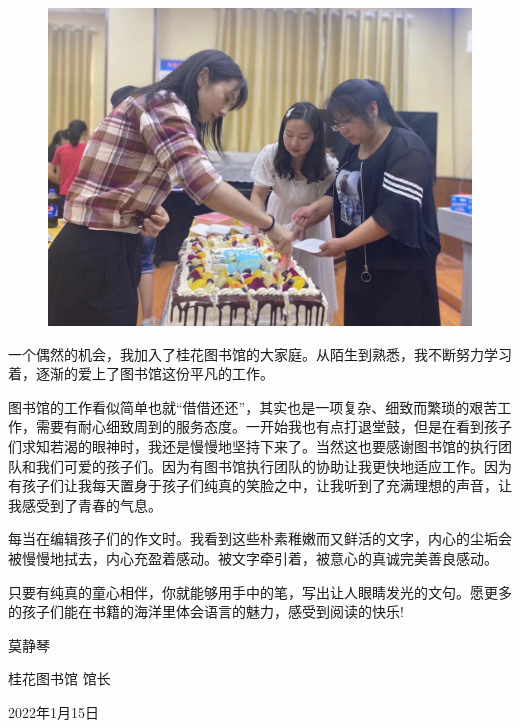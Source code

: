 \begin{figure}[htbp]

\centering

\includegraphics[width = .5\textwidth]{./ch/mjq.jpg}

\end{figure}



一个偶然的机会，我加入了桂花图书馆的大家庭。从陌生到熟悉，我不断努力学习着，逐渐的爱上了图书馆这份平凡的工作。

图书馆的工作看似简单也就“借借还还”，其实也是一项复杂、细致而繁琐的艰苦工作，需要有耐心细致周到的服务态度。一开始我也有点打退堂鼓，但是在看到孩子们求知若渴的眼神时，我还是慢慢地坚持下来了。当然这也要感谢图书馆的执行团队和我们可爱的孩子们。因为有图书馆执行团队的协助让我更快地适应工作。因为有孩子们让我每天置身于孩子们纯真的笑脸之中，让我听到了充满理想的声音，让我感受到了青春的气息。

每当在编辑孩子们的作文时。我看到这些朴素稚嫩而又鲜活的文字，内心的尘垢会被慢慢地拭去，内心充盈着感动。被文字牵引着，被意心的真诚完美善良感动。

只要有纯真的童心相伴，你就能够用手中的笔，写出让人眼睛发光的文句。愿更多的孩子们能在书籍的海洋里体会语言的魅力，感受到阅读的快乐!
 


\vspace{10pt}

 莫静琴


桂花图书馆 馆长

2022年1月15日
                



\vspace{10pt}

\hline



\clearpage

             
